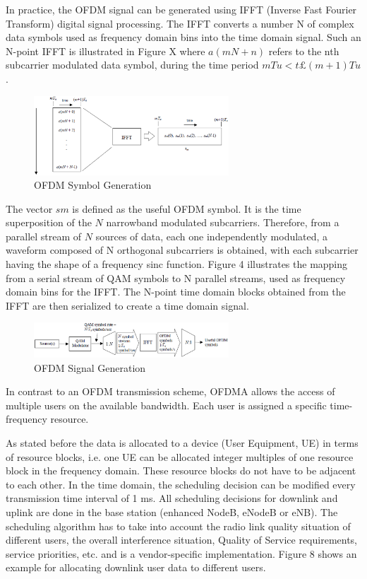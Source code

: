In practice, the OFDM signal can be generated using IFFT (Inverse Fast Fourier Transform)
digital signal processing. The IFFT converts a number N of complex data
symbols used as frequency domain bins into the time domain signal. Such an N-point
IFFT is illustrated in Figure X where $a(mN+n)$ refers to the nth subcarrier
modulated data symbol, during the time period $mTu < t £ (m+1)Tu$.

\begin{figure}[htbp]
    \centering
    \includegraphics[width=0.65\textwidth]{./figures/ofdm_symbol_gen}
    \caption{ OFDM Symbol Generation
    \label{fig:ofdmsymbol}}
\end{figure}

The vector $sm$ is defined as the useful OFDM symbol. It is the time superposition
of the $N$ narrowband modulated subcarriers. Therefore, from a parallel stream
of $N$ sources of data, each one independently modulated, a waveform composed of
N orthogonal subcarriers is obtained, with each subcarrier having the shape of a
frequency sinc function. Figure 4 illustrates the mapping from a
serial stream of QAM symbols to N parallel streams, used as frequency domain bins
for the IFFT. The N-point time domain blocks obtained from the IFFT are then
serialized to create a time domain signal.

\begin{figure}[htbp]
    \centering
    \includegraphics[width=0.65\textwidth]{./figures/ofdm_signal_chain}
    \caption{ OFDM Signal Generation
    \label{fig:ofdmchain}}
\end{figure}

In contrast to an OFDM transmission scheme, OFDMA allows the access of multiple
users on the available bandwidth. Each user is assigned a specific time-frequency
resource.

As stated before the data is allocated to a device (User Equipment, UE) in terms
of resource blocks, i.e. one UE can be allocated integer multiples of one resource
block in the frequency domain. These resource blocks do not have to be adjacent to
each other. In the time domain, the scheduling decision can be modified every
transmission time interval of 1 ms. All scheduling decisions for downlink and
uplink are done in the base station (enhanced NodeB, eNodeB or eNB). The scheduling
algorithm has to take into account the radio link quality situation of different
users, the overall interference situation, Quality of Service requirements, service
priorities, etc. and is a vendor-specific implementation. Figure 8 shows an example
for allocating downlink user data to different users.\\

